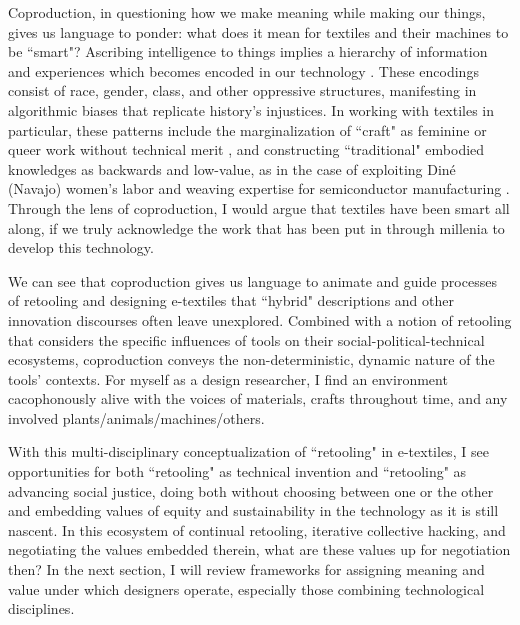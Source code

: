 Coproduction, in questioning how we make meaning while making our things, gives us language to ponder: what does it mean for textiles and their machines to be ``smart"? Ascribing intelligence to things implies a hierarchy of information and experiences which becomes encoded in our technology \todo{[56,65]}. These encodings consist of race, gender, class, and other oppressive structures, manifesting in algorithmic biases that replicate history's injustices. In working with textiles in particular, these patterns include the marginalization of ``craft" as feminine or queer work without technical merit \todo{[11,22,54,130]}, and constructing ``traditional" embodied knowledges as backwards and low-value, as in the case of exploiting Din\'{e} (Navajo) women's labor and weaving expertise for semiconductor manufacturing \cite{nakamura_indigenous_2014}. Through the lens of coproduction, I would argue that textiles have been smart all along, if we truly acknowledge the work that has been put in through millenia to develop this technology.

We can see that coproduction gives us language to animate and guide processes of retooling and designing e-textiles that ``hybrid" descriptions and other innovation discourses often leave unexplored. Combined with a notion of retooling that considers the specific influences of tools on their social-political-technical ecosystems, coproduction conveys the non-deterministic, dynamic nature of the tools' contexts. For myself as a design researcher, I find an environment cacophonously alive with the voices of materials, crafts throughout time, and any involved plants/animals/machines/others. 



With this multi-disciplinary conceptualization of ``retooling" in e-textiles, I see opportunities for both ``retooling" as technical invention and ``retooling" as advancing social justice, doing both without choosing between one or the other and embedding values of equity and sustainability in the technology as it is still nascent. In this ecosystem of continual retooling, iterative collective hacking, and negotiating the values embedded therein, what are these values up for negotiation then? In the next section, I will review frameworks for assigning meaning and value under which designers operate, especially those combining technological disciplines.
